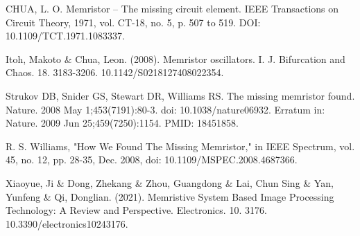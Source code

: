 \documentclass[12pt,a4paper]{report} %
\begin{document}
	\begin{thebibliography}{99}
		 CHUA, L. O. Memristor – The missing circuit element. IEEE
		Transactions on Circuit Theory, 1971, vol. CT-18, no. 5, p. 507 to
		519. DOI: 10.1109/TCT.1971.1083337.
		
		 Itoh, Makoto \& Chua, Leon. (2008). Memristor oscillators. I. J. Bifurcation and Chaos. 18. 3183-3206. 10.1142/S0218127408022354. 
		
		 Strukov DB, Snider GS, Stewart DR, Williams RS. The missing memristor found. Nature. 2008 May 1;453(7191):80-3. doi: 10.1038/nature06932. Erratum in: Nature. 2009 Jun 25;459(7250):1154. PMID: 18451858.
		
		 R. S. Williams, "How We Found The Missing Memristor," in IEEE Spectrum, vol. 45, no. 12, pp. 28-35, Dec. 2008, doi: 10.1109/MSPEC.2008.4687366.
		
		 Xiaoyue, Ji \& Dong, Zhekang \& Zhou, Guangdong \& Lai, Chun Sing \& Yan, Yunfeng \& Qi, Donglian. (2021). Memristive System Based Image Processing Technology: A Review and Perspective. Electronics. 10. 3176. 10.3390/electronics10243176. 
		
	\end{thebibliography}
	
	\newpage
	

\end{document}
